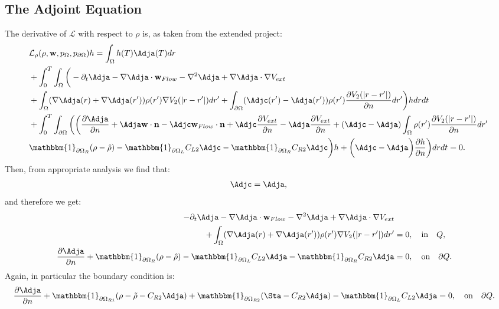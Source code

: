 \subsection*{The Adjoint Equation}
The derivative of $\mathcal{L}$ with respect to $\rho$ is, as taken from the extended project:
\begin{align*}
&\mathcal{L}_\rho (\rho,\mathbf{w},p_\Omega,p_{\partial \Omega})h=
\int_\Omega h(T) \Adja(T) dr\\
&+ \int_0^T \int_\Omega \bigg(   - \partial_t \Adja  - \nabla \Adja \cdot \mathbf{w}_{Flow}  - \nabla^2 \Adja \notag 
+  \nabla \Adja \cdot \nabla V_{ext}  \notag \\
&+ \int_\Omega (\nabla  \Adja(r)+\nabla  \Adja(r')) \rho(r') \nabla V_2(|r-r'|) dr'+ \int_{\partial \Omega} ( \Adjc(r') - \Adja(r')) \rho(r')   \frac{\partial V_2(|r-r'|)}{\partial n} dr' \bigg) h dr dt \\
&+  \int_0^T\int_{\partial \Omega}  \bigg(
\bigg(\frac{\partial \Adja }{\partial n} + \Adja  \mathbf{w} \cdot \mathbf{n} - \Adjc \mathbf{w}_{Flow} \cdot \mathbf{n}  +  \Adjc \dfrac{\partial V_{ext}}{\partial n} - \Adja \frac{\partial V_{ext}}{\partial n} + ( \Adjc - \Adja)  \int_\Omega \rho(r') \frac{\partial V_2(|r-r'|)}{\partial n} dr'\\
&\mathbbm{1}_{\partial \Omega_R} (\rho- \hat{\rho}) -\mathbbm{1}_{\partial \Omega_L} C_{L2} \Adjc   -\mathbbm{1}_{\partial \Omega_R} C_{R2} \Adjc \bigg)h + \bigg( \Adjc- \Adja \bigg) \frac{\partial h}{\partial n} \bigg) dr dt =0.
\end{align*}
Then, from appropriate analysis we find that:
\begin{align*}
\Adjc = \Adja,
\end{align*}
and therefore we get:
\begin{align*}
- \partial_t  \Adja  - \nabla \Adja \cdot \mathbf{w}_{Flow}  - \nabla^2 \Adja \notag 
+  \nabla \Adja \cdot \nabla V_{ext}  \notag \\
+ \int_\Omega (\nabla  \Adja(r)+\nabla  \Adja(r')) \rho(r') \nabla V_2(|r-r'|) dr' &=0, \quad \text{in} \quad Q, \\
\frac{\partial \Adja }{\partial n}+ \mathbbm{1}_{\partial \Omega_R} (\rho- \hat{\rho}) -\mathbbm{1}_{\partial \Omega_L} C_{L2} \Adja   -\mathbbm{1}_{\partial \Omega_R} C_{R2} \Adja&=0, \quad \text{on} \quad \partial Q.
\end{align*}
Again, in particular the boundary condition is:
\begin{align*}
\frac{\partial \Adja }{\partial n}+ \mathbbm{1}_{\partial \Omega_{R1}}(\rho- \tilde{\rho} -C_{R2} \Adja) + \mathbbm{1}_{\partial \Omega_{R2}} (\Sta-C_{R2} \Adja) - \mathbbm{1}_{\partial \Omega_L} C_{L2} \Adja   &=0, \quad \text{on} \quad \partial Q.
\end{align*}

